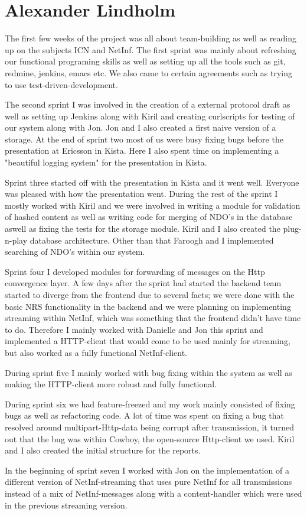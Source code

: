 \section{Alexander Lindholm}
The first few weeks of the project was all about team-building as well as reading up on the subjects ICN and NetInf. The first sprint was mainly about refreshing our functional programing skills as well as setting up all the tools such as git, redmine, jenkins, emacs etc. We also came to certain agreements such as trying to use test-driven-development. 

The second sprint I was involved in the creation of a external protocol draft as well as setting up Jenkins along with Kiril and creating curlscripts for testing of our system along with Jon. Jon and I also created a first naive version of a storage. At the end of sprint two most of us were busy fixing bugs before the presentation at Ericsson in Kista. Here I also spent time on implementing a "beautiful logging system" for the presentation in Kista.

Sprint three started off with the presentation in Kista and it went well. Everyone was pleased with how the presentation went. During the rest of the sprint I mostly worked with Kiril and we were involved in writing a module for validation of hashed content as well as writing code for merging of NDO's in the database aswell as fixing the tests for the storage module. Kiril and I also created the plug-n-play database architecture. Other than that Faroogh and I implemented searching of NDO's within our system.

Sprint four I developed modules for forwarding of messages on the Http convergence layer.
A few days after the sprint had started the backend team started to diverge from the frontend due to several facts;
we were done with the basic NRS functionality in the backend and we were planning on implementing streaming within NetInf, which was something that the frontend didn't have time to do. 
Therefore I mainly worked with Danielle and Jon this sprint and implemented a HTTP-client that would come to be used mainly for streaming, but also worked as a fully functional NetInf-client. 

During sprint five I mainly worked with bug fixing within the system as well as making the HTTP-client more robust and fully functional.

During sprint six we had feature-freezed and my work mainly consisted of fixing bugs as well as refactoring code. A lot of time was spent on fixing a bug that resolved around multipart-Http-data being corrupt after transmission, it turned out that the bug was within Cowboy, the open-source Http-client we used. Kiril and I also created the initial structure for the reports. 

In the beginning of sprint seven I worked with Jon on the implementation of a different version of NetInf-streaming that uses pure NetInf for all transmissions instead of a mix of NetInf-messages along with a content-handler which were used in the previous streaming version. 

